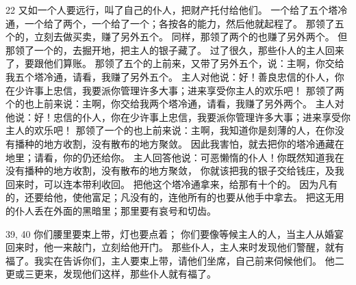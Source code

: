22  又如一个人要远行，叫了自己的仆人，把财产托付给他们。 一个给了五个塔冷通，一个给了两个，一个给了一个；各按各的能力，然后他就起程了。  那领了五个的，立刻去做买卖，赚了另外五个。 同样，那领了两个的也赚了另外两个。 但那领了一个的，去掘开地，把主人的银子藏了。 过了很久，那些仆人的主人回来了，要跟他们算账。 那领了五个的上前来，又带了另外五个，说：主啊，你交给我五个塔冷通，请看，我赚了另外五个。 主人对他说：好！善良忠信的仆人，你在少许事上忠信，我要派你管理许多大事；进来享受你主人的欢乐吧！ 那领了两个的也上前来说：主啊，你交给我两个塔冷通，请看，我赚了另外两个。 主人对他说：好！忠信的仆人，你在少许事上忠信，我要派你管理许多大事；进来享受你主人的欢乐吧！ 那领了一个的也上前来说：主啊，我知道你是刻薄的人，在你没有播种的地方收割，没有散布的地方聚敛。 因此我害怕，就去把你的塔冷通藏在地里；请看，你的仍还给你。 主人回答他说：可恶懒惰的仆人！你既然知道我在没有播种的地方收割，没有散布的地方聚敛， 你就该把我的银子交给钱庄，及我回来时，可以连本带利收回。 把他这个塔冷通拿来，给那有十个的。  因为凡有的，还要给他，使他富足；凡没有的，连他所有的也要从他手中拿去。 把这无用的仆人丢在外面的黑暗里；那里要有哀号和切齿。\par

39, 40  你们腰里要束上带，灯也要点着； 你们要像等候主人的人，当主人从婚宴回来时，他一来敲门，立刻给他开门。 那些仆人，主人来时发现他们警醒，就有福了。我实在告诉你们，主人要束上带，请他们坐席，自己前来伺候他们。 他二更或三更来，发现他们这样，那些仆人就有福了。\par

